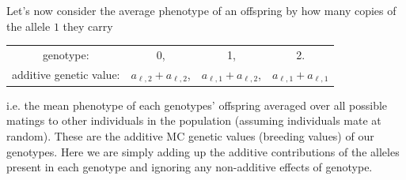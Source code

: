 

Let's now consider the average phenotype of an offspring by how many
copies of the allele $1$ they carry
\begin{center}
\begin{tabular}{cccc}
genotype: & 0, & 1, & 2.\\
additive genetic value: & $a_{\ell,2}+ a_{\ell,2}$, & $a_{\ell,1}+a_{\ell,2}$, & $a_{\ell,1}+a_{\ell,1}$   \label{add_values}
\end{tabular}
\end{center}
%
i.e. the mean phenotype of each genotypes' offspring
averaged over all possible matings to other individuals in the
population (assuming individuals mate at random). These are the
additive MC genetic values (breeding values) of our genotypes. 
Here we are simply adding up the additive contributions of the alleles present
in each genotype and ignoring any non-additive effects of genotype.


